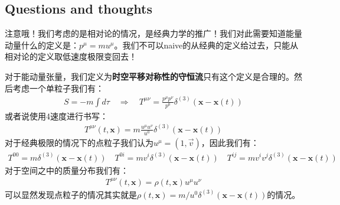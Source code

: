 \subsection{Questions and thoughts}


注意哦！我们考虑的是相对论的情况，是经典力学的推广！我们对此需要知道能量动量什么的定义是：$ p^\mu = m u^\mu
$。我们不可以naive的从经典的定义给过去，只能从相对论的定义取低速度极限变回去！

对于能动量张量，我们定义为\textbf{时空平移对称性的守恒流}只有这个定义是合理的。然后考虑一个单粒子我们有：
\begin{align}
  S=-m\int d\tau \quad \Rightarrow \quad T^{\mu\nu} =
  \displaystyle\frac{p^\mu p^\nu}{p^0}  \delta^{(3)}(\mathbf{x} -
  \mathbf{x}(t))
\end{align}
或者说使用4速度进行书写：
\begin{align}
  T^{\mu\nu}(t,\mathbf{x})=m\left.\frac{u^\mu
  u^\nu}{u^0}\right.\delta^{(3)}(\mathbf{x}-\mathbf{x}(t))
\end{align}
对于经典极限的情况下的点粒子我们认为$ u^\mu = (1, \vec{v}) $，因此我们有：
\begin{align}
  T^{00} = m \delta^{(3)}(\mathbf{x} - \mathbf{x}(t)) \quad T^{0i} =
  m v^i \delta^{(3)}(\mathbf{x} - \mathbf{x}(t)) \quad T^{ij} = m v^i
  v^j \delta^{(3)}(\mathbf{x} - \mathbf{x}(t))
\end{align}
对于空间之中的质量分布我们有：
\begin{align}
  T^{\mu\nu}(t,\mathbf{x})=\rho(t,\mathbf{x})u^\mu u^\nu
\end{align}
可以显然发现点粒子的情况其实就是$  \rho(t,\mathbf{x}) = m/u^0 \delta^{(3)}(\mathbf{x} -
\mathbf{x}(t)) $的情况。
